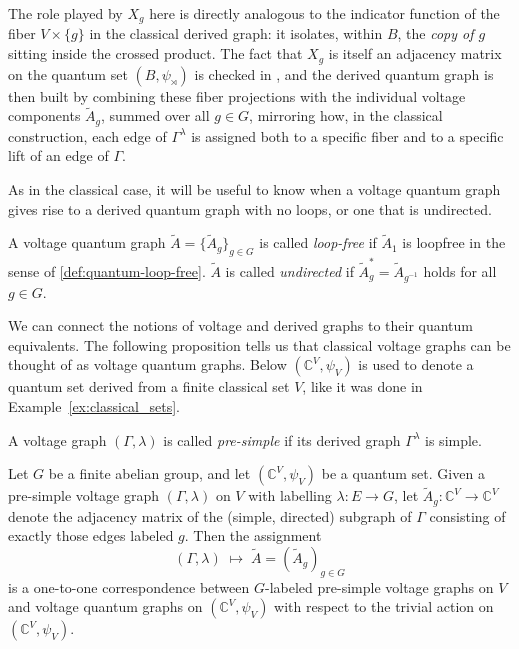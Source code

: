 The role played by \( X_g \) here is directly analogous to the
indicator function of the fiber \( V \times \{g\} \) in the classical
derived graph: it isolates, within \( B \), the \emph{copy of \( g \)}
sitting inside the crossed product. The fact that \( X_g \) is itself
an adjacency matrix on the quantum set \( (B,\psi_\rtimes) \) is
checked in \textcite[Proposition~4.5]{tobolski26}, and the derived
quantum graph is then built by combining these fiber projections with
the individual voltage components \( \widetilde{A}_g \), summed over all
\( g \in G \), mirroring how, in the classical construction, each
edge of \( \Gamma^\lambda \) is assigned both to a specific fiber and
to a specific lift of an edge of \( \Gamma \).

As in the classical case, it will be useful to know when a voltage
quantum graph gives rise to a derived quantum graph with no loops, or
one that is undirected.

\begin{definition}
    \label{def:voltage-quantum-graph-loop-free}
    A voltage quantum graph \( \widetilde{A} = \{\widetilde{A}_g\}_{g \in G} \)
    is called \emph{loop-free} if \( \widetilde{A}_{1} \) is loopfree in
    the sense of \ref{def:quantum-loop-free}. \( \widetilde{A} \) is
    called \emph{undirected} if \( \widetilde{A}^{*}_{g} =
    \widetilde{A}_{g^{-1}} \) holds for all \( g \in G \).
\end{definition}

We can connect the notions of voltage and derived graphs to their quantum
equivalents. The following proposition tells us that classical voltage graphs
can be thought of as voltage quantum graphs.
Below \( (\mathbb{C}^{V}, \psi_V) \) is used to denote a quantum set derived
from a finite classical set \( V \), like it was done in
Example~\ref{ex:classical_sets}.

\begin{definition}
    A voltage graph \( (\Gamma, \lambda) \) is called \emph{pre-simple} if
    its derived graph \( \Gamma^{\lambda} \) is simple.
\end{definition}

\begin{proposition}
    \label{prop:equivalence}
    Let \( G \) be a finite abelian group, and let
    \( (\mathbb{C}^V, \psi_V) \) be a quantum set. Given a
    pre-simple voltage graph \( (\Gamma,\lambda) \) on \( V \) with
    labelling \( \lambda \colon E \to G \), let
    \( \widetilde{A}_g \colon \mathbb{C}^V \to \mathbb{C}^V \) denote the
    adjacency matrix of the (simple, directed) subgraph of \( \Gamma \)
    consisting of exactly those edges labeled \( g \). Then the
    assignment
    \[
        (\Gamma,\lambda) \;\longmapsto\; \widetilde{A} =
        (\widetilde{A}_g)_{g \in G}
    \]
    is a one-to-one correspondence between \( G \)-labeled pre-simple
    voltage graphs on \( V \) and voltage quantum graphs on
    \( (\mathbb{C}^V, \psi_V) \) with respect to the trivial action on
    \( (\mathbb{C}^V, \psi_V) \).
\end{proposition}

